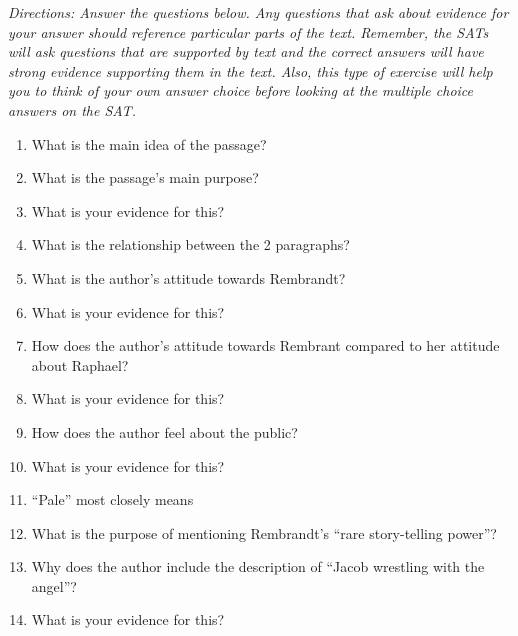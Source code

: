\bigskip
\textit{Directions: Answer the questions below. Any questions that ask about evidence for your answer should reference particular parts of the text. Remember, the SATs will ask questions that are supported by text and the correct answers will have strong evidence supporting them in the text. Also, this type of exercise will help you to think of your own answer choice before looking at the multiple choice answers on the SAT.}

\begin{enumerate}
\item What is the main idea of the passage? \hrulefill

\item What is the passage's main purpose? \hrulefill

\item What is your evidence for this? \hrulefill

\item What is the relationship between the 2 paragraphs? \hrulefill

\item What is the author's attitude towards Rembrandt? \hrulefill

\item What is your evidence for this? \hrulefill

\item How does the author's attitude towards Rembrant compared to her attitude about Raphael? \hrulefill

\item What is your evidence for this? \hrulefill

\item How does the author feel about the public? \hrulefill

\item What is your evidence for this? \hrulefill

\item ``Pale'' most closely means \hrulefill

\item What is the purpose of mentioning Rembrandt's ``rare story-telling power''? \hrulefill

\item Why does the author include the description of ``Jacob wrestling with the angel''? \hrulefill

\item What is your evidence for this? \hrulefill
\end{enumerate}